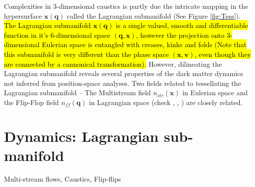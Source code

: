  
Complexities in 3-dimensional caustics is partly due the intricate mapping in the hypersurface $\mathbf{x}(\mathbf{q})$ called the Lagrangian submanifold (See Figure \ref{fig:Tess}). 
\hl{The Lagrangian submanifold $\mathbf{x}(\mathbf{q})$  is a single valued, smooth and differentiable function in it's 6-dimensional space $(\mathbf{q}, \mathbf{x})$, however the projection onto 3-dimensional Eulerian space is entangled with creases, kinks and folds (Note that this  submanifold is very different than the phase space $(\mathbf{x},\mathbf{v})$, even though they are connected by a cannonical transformation).} However, dilineating the Lagrangian submanifold reveals several properties of the dark matter dynamics not inferred from position-space analyses. Two fields related to tessellating the Lagrangian submanifold -- The Multistream field $n_{str}(\mathbf{x})$ in Eulerian space and the Flip-Flop field $n_{ff}(\mathbf{q})$ in Lagrangian space (check \cite{Shandarin2012}, \cite{Ramachandra2015}, \cite{Shandarin2016}) are closely related. 




\section{Dynamics: Lagrangian sub-manifold}
Multi-stream flows, Caustics, Flip-flips